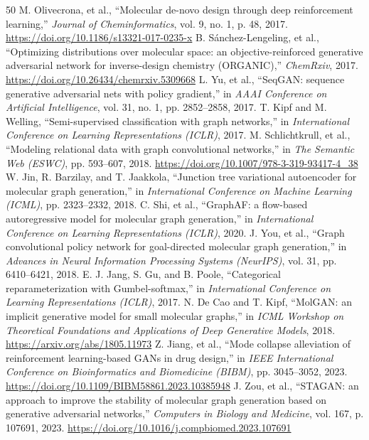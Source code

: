 \documentclass[10pt,a4paper]{article}
\begin{document}
\begin{thebibliography}{50}
 M. Olivecrona, et al., ``Molecular de-novo design through deep reinforcement learning,'' \textit{Journal of Cheminformatics}, vol. 9, no. 1, p. 48, 2017. \url{https://doi.org/10.1186/s13321-017-0235-x}
 B. Sánchez-Lengeling, et al., ``Optimizing distributions over molecular space: an objective-reinforced generative adversarial network for inverse-design chemistry (ORGANIC),'' \textit{ChemRxiv}, 2017. \url{https://doi.org/10.26434/chemrxiv.5309668}
 L. Yu, et al., ``SeqGAN: sequence generative adversarial nets with policy gradient,'' in \textit{AAAI Conference on Artificial Intelligence}, vol. 31, no. 1, pp. 2852--2858, 2017.
 T. Kipf and M. Welling, ``Semi-supervised classification with graph networks,'' in \textit{International Conference on Learning Representations (ICLR)}, 2017.
 M. Schlichtkrull, et al., ``Modeling relational data with graph convolutional networks,'' in \textit{The Semantic Web (ESWC)}, pp. 593--607, 2018. \url{https://doi.org/10.1007/978-3-319-93417-4_38}
 W. Jin, R. Barzilay, and T. Jaakkola, ``Junction tree variational autoencoder for molecular graph generation,'' in \textit{International Conference on Machine Learning (ICML)}, pp. 2323--2332, 2018.
 C. Shi, et al., ``GraphAF: a flow-based autoregressive model for molecular graph generation,'' in \textit{International Conference on Learning Representations (ICLR)}, 2020.
 J. You, et al., ``Graph convolutional policy network for goal-directed molecular graph generation,'' in \textit{Advances in Neural Information Processing Systems (NeurIPS)}, vol. 31, pp. 6410--6421, 2018.
 E. J. Jang, S. Gu, and B. Poole, ``Categorical reparameterization with Gumbel-softmax,'' in \textit{International Conference on Learning Representations (ICLR)}, 2017.
 N. De Cao and T. Kipf, ``MolGAN: an implicit generative model for small molecular graphs,'' in \textit{ICML Workshop on Theoretical Foundations and Applications of Deep Generative Models}, 2018. \url{https://arxiv.org/abs/1805.11973}
 Z. Jiang, et al., ``Mode collapse alleviation of reinforcement learning-based GANs in drug design,'' in \textit{IEEE International Conference on Bioinformatics and Biomedicine (BIBM)}, pp. 3045--3052, 2023. \url{https://doi.org/10.1109/BIBM58861.2023.10385948}
 J. Zou, et al., ``STAGAN: an approach to improve the stability of molecular graph generation based on generative adversarial networks,'' \textit{Computers in Biology and Medicine}, vol. 167, p. 107691, 2023. \url{https://doi.org/10.1016/j.compbiomed.2023.107691}

\end{thebibliography}
\end{document}
